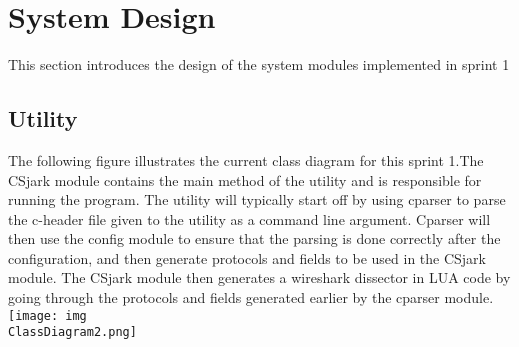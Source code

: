 \usepackage[pdftex]{graphicx}
\section{System Design}

This section introduces the design of the system modules implemented in sprint 1

\subsection{Utility}
The following figure illustrates the current class diagram for this sprint 1.The CSjark module contains the main method of the utility and is responsible for running the program. The utility will typically start off by using cparser to parse the c-header file given to the utility as a command line argument. Cparser will then use the config module to ensure that the parsing is done correctly after the configuration, and then generate protocols and fields to be used in the CSjark module. The CSjark module then generates a wireshark dissector in LUA code by going through the protocols and fields generated earlier by the cparser module. \texttt{[image: img\\ClassDiagram2.png]}





